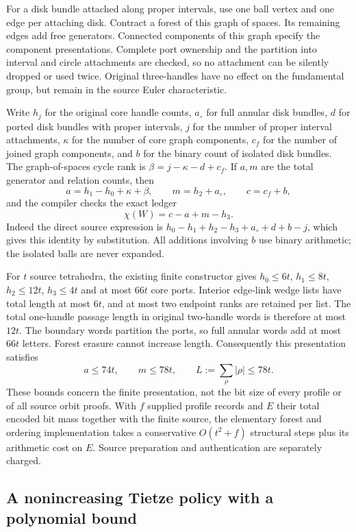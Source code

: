 For a disk bundle attached along proper intervals, use one ball vertex
and one edge per attaching disk.  Contract a forest of this graph of
spaces.  Its remaining edges add free generators.  Connected components
of this graph specify the component presentations.  Complete port
ownership and the partition into interval and circle attachments are
checked, so no attachment can be silently dropped or used twice.
Original three-handles have no effect on the fundamental group, but
remain in the source Euler characteristic.

Write $h_j$ for the original core handle counts, $a_\circ$ for full
annular disk bundles, $d$ for ported disk bundles with proper intervals,
$j$ for the number of proper interval attachments, $\kappa$ for the
number of core graph components, $c_f$ for the number of joined graph
components, and $b$ for the binary count of isolated disk bundles.
The graph-of-spaces cycle rank is $\beta=j-\kappa-d+c_f$.  If $a,m$ are
the total generator and relation counts, then
\[
 a=h_1-h_0+\kappa+\beta,\qquad m=h_2+a_\circ,\qquad c=c_f+b,
\]
and the compiler checks the exact ledger
\begin{equation}
 \chi(W)=c-a+m-h_3.
 \label{euler-group:ledger}
\end{equation}
Indeed the direct source expression is
$h_0-h_1+h_2-h_3+a_\circ+d+b-j$, which gives this identity by substitution.
All additions involving $b$ use binary arithmetic; the isolated balls
are never expanded.

For $t$ source tetrahedra, the existing finite constructor gives
$h_0\leq6t$, $h_1\leq8t$, $h_2\leq12t$, $h_3\leq4t$ and at most $66t$
core ports.  Interior edge-link wedge lists have total length at most
$6t$, and at most two endpoint ranks are retained per list.  The total
one-handle passage length in original two-handle words is therefore at
most $12t$.  The boundary words partition the ports, so full annular
words add at most $66t$ letters.  Forest erasure cannot increase length.
Consequently this presentation satisfies
\[
 a\leq74t,\qquad m\leq78t,\qquad L:=\sum_\rho|\rho|\leq78t.
\]
These bounds concern the finite presentation, not the bit size of every
profile or of all source orbit proofs.  With $f$ supplied profile
records and $E$ their total encoded bit mass together with the finite
source, the elementary forest and ordering implementation takes a
conservative $O(t^2+f)$ structural steps plus its arithmetic cost on $E$.
Source preparation and authentication are separately charged.

\subsection{A nonincreasing Tietze policy with a polynomial bound}

